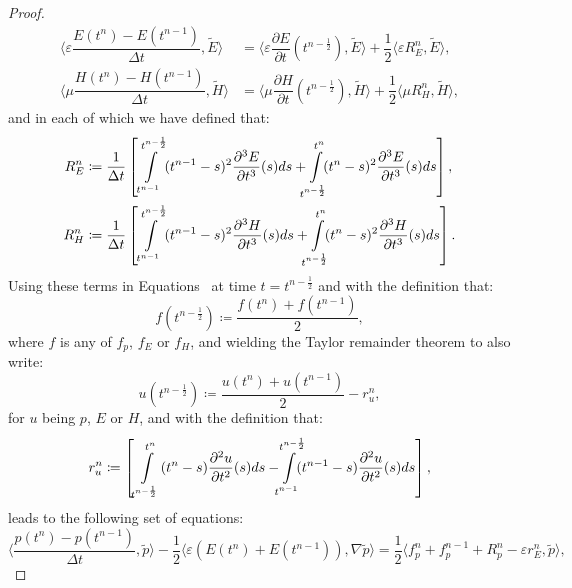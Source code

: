 \documentclass{amsart}
\theoremstyle{thmstyleone}%
\theoremstyle{thmstyletwo}%
\theoremstyle{thmstylethree}%
\newcommand{\ainnerproduct}[2]{\langle #1, #2 \rangle}
\newcommand{\aInnerproduct}[2]{\bigl\langle #1, #2 \bigr\rangle}
\begin{document}
\begin{proof}
\begin{align*}
  \ainnerproduct{\varepsilon \dfrac{E(t^n) - E(t^{n - 1})}{\Delta t}}{\widetilde{E}} &= \ainnerproduct{\varepsilon \dfrac{\partial E}{\partial t}(t^{n - \frac{1}{2}})}{\widetilde{E}} + \dfrac{1}{2} \ainnerproduct{\varepsilon R^n_E}{\widetilde{E}}, \\
  \ainnerproduct{\mu \dfrac{H(t^n) - H(t^{n - 1})}{\Delta t}}{\widetilde{H}} &= \ainnerproduct{\mu \dfrac{\partial H}{\partial t}(t^{n - \frac{1}{2}})}{\widetilde{H}} + \dfrac{1}{2} \ainnerproduct{\mu R^n_H}{\widetilde{H}},
\end{align*}
and in each of which we have defined that:
\begin{align*}
  R^n_E &\coloneq \dfrac{1}{\Delta t} \left[\int\limits_{t^{n - 1}}^{t^{n - \frac{1}{2}}} (t^{n - 1} - s)^2 \dfrac{\partial^3 E}{\partial t^3}(s) ds + \int\limits_{\mathclap{t^{n - \frac{1}{2}}}}^{t^n} (t^n - s)^2 \dfrac{\partial^3 E}{\partial t^3}(s) ds \right], \\
  R^n_H &\coloneq \dfrac{1}{\Delta t} \left[\int\limits_{t^{n - 1}}^{t^{n - \frac{1}{2}}} (t^{n - 1} - s)^2 \dfrac{\partial^3 H}{\partial t^3}(s) ds + \int\limits_{\mathclap{t^{n - \frac{1}{2}}}}^{t^n} (t^n - s)^2 \dfrac{\partial^3 H}{\partial t^3}(s) ds \right].
\end{align*}
Using these terms in Equations~ at time $t = t^{n - \frac{1}{2}}$ and with the definition that:
\[
  f(t^{n - \frac{1}{2}}) \coloneq \dfrac{f(t^n) + f(t^{n - 1})}{2},
\] 
where $f$ is any of $f_p$, $f_E$ or $f_H$, and wielding the Taylor remainder theorem to also write:
\[
  u(t^{n - \frac{1}{2}}) \coloneq \dfrac{u(t^n) + u(t^{n - 1})}{2} - r_u^n,
\] 
for $u$ being $p$, $E$ or $H$, and with the definition that:
\[
r_u^n \coloneqq \left[ \int\limits_{t^{n - \frac{1}{2}}}^{t^n} (t^n - s) \dfrac{\partial^2 u}{\partial t^2}(s) ds - \int\limits_{\mathclap{t^{n - 1}}}^{\mathclap{t^{n - \frac{1}{2}}}} (t^{n - 1} - s) \dfrac{\partial^2 u}{\partial t^2}(s) ds\right],
\]
leads to the following set of equations:
\begin{subequations}
  \begin{equation}
    \ainnerproduct{\dfrac{p(t^n) - p(t^{n - 1})}{\Delta t}}{\widetilde{p}} - \dfrac{1}{2} \aInnerproduct{ \varepsilon \left(E(t^n) + E(t^{n - 1})\right)}{\nabla \widetilde{p}} = 
    \dfrac{1}{2} \aInnerproduct{f_p^n + f_p^{n - 1} + R_p^n - \varepsilon r_E^n }{\widetilde{p}}, \label{eqn:remainder_p_cn}
  \end{equation} 

\end{subequations}
\end{proof}
\end{document}
